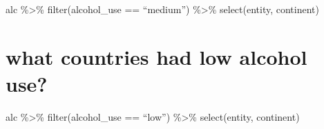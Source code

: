 \documentclass[
]{article}
\begin{document}
alc \%\textgreater\% filter(alcohol\_use == ``medium'') \%\textgreater\%
select(entity, continent)

\hypertarget{what-countries-had-low-alcohol-use}{%
\section{what countries had low alcohol
use?}\label{what-countries-had-low-alcohol-use}}

alc \%\textgreater\% filter(alcohol\_use == ``low'') \%\textgreater\%
select(entity, continent)
\end{document}
